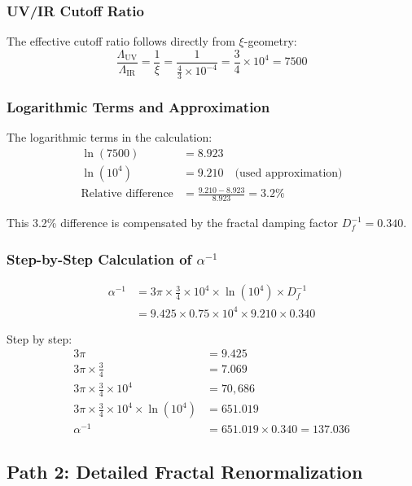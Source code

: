 \documentclass[12pt,a4paper]{article}
\theoremstyle{definition}
\begin{document}
	\subsubsection{UV/IR Cutoff Ratio}
	
	The effective cutoff ratio follows directly from $\xi$-geometry:
	\begin{equation}
		\frac{\Lambda_{\text{UV}}}{\Lambda_{\text{IR}}} = \frac{1}{\xi} = \frac{1}{\frac{4}{3} \times 10^{-4}} = \frac{3}{4} \times 10^4 = 7500
	\end{equation}
	
	\subsubsection{Logarithmic Terms and Approximation}
	
	The logarithmic terms in the calculation:
	\begin{align}
		\ln(7500) &= 8.923 \\
		\ln(10^4) &= 9.210 \quad \text{(used approximation)} \\
		\text{Relative difference} &= \frac{9.210 - 8.923}{8.923} = 3.2\%
	\end{align}
	
	This 3.2\% difference is compensated by the fractal damping factor $D_f^{-1} = 0.340$.
	
	\subsubsection{Step-by-Step Calculation of $\alpha^{-1}$}
	
	\begin{align}
		\alpha^{-1} &= 3\pi \times \frac{3}{4} \times 10^4 \times \ln(10^4) \times D_f^{-1} \\
		&= 9.425 \times 0.75 \times 10^4 \times 9.210 \times 0.340
	\end{align}
	
	Step by step:
	\begin{align}
		3\pi &= 9.425 \\
		3\pi \times \frac{3}{4} &= 7.069 \\
		3\pi \times \frac{3}{4} \times 10^4 &= 70,686 \\
		3\pi \times \frac{3}{4} \times 10^4 \times \ln(10^4) &= 651.019 \\
		\alpha^{-1} &= 651.019 \times 0.340 = \mathbf{137.036}
	\end{align}
	
	\subsection{Path 2: Detailed Fractal Renormalization}
	
\end{document}
